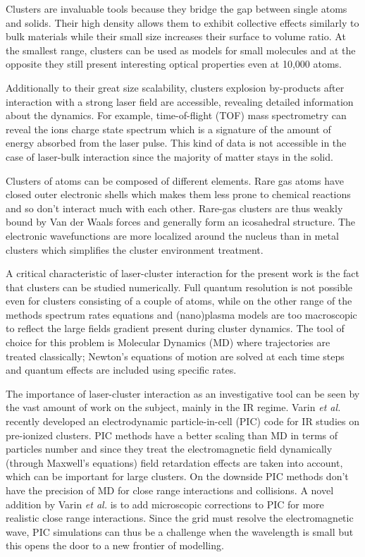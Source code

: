 Clusters are invaluable tools because they bridge the gap between single atoms
and solids. Their high density allows them to exhibit collective effects similarly
to bulk materials while their small
size increases their surface to volume ratio.
At the smallest range, clusters can be used as models for small molecules and
at the opposite they still present interesting optical properties even at 10,000
atoms\cite{Reinhard2004}.

Additionally to their great size scalability, clusters explosion by-products
after interaction with a strong laser field are accessible, revealing detailed
information about the dynamics. For example, time-of-flight (TOF) mass
spectrometry can reveal the ions charge state spectrum which
is a signature of the amount
of energy absorbed from the laser pulse. This kind of data is not accessible
in the case of laser-bulk interaction since the majority of matter stays
in the solid.

Clusters of atoms can be composed of different elements. Rare gas atoms have
closed outer electronic shells which makes them less prone to chemical
reactions and so don't interact much with each other. Rare-gas clusters are
thus weakly bound by Van der Waals forces and generally form
an icosahedral structure\cite{Martin1996}. The electronic wavefunctions are
more localized around the nucleus than in metal clusters which simplifies the
cluster environment treatment.

A critical characteristic of laser-cluster interaction for the present
work is the fact that clusters can be studied numerically. Full quantum resolution
is not possible even for clusters consisting of a couple of atoms, while on the
other range of the methods spectrum rates equations and (nano)plasma models are
too macroscopic to reflect the large fields gradient present during cluster
dynamics\cite{Fennel2010}. The tool of choice for this problem is Molecular Dynamics
(MD) where trajectories are treated classically; Newton's equations of motion are
solved at each time steps and quantum effects are included using specific rates.

The importance of laser-cluster interaction as an investigative tool
can be seen by the vast amount of work on the subject, mainly
in the IR regime\cite{Fennel2010}. Varin \textit{et al.}\cite{Varin2012}
recently developed an electrodynamic
particle-in-cell (PIC) code for IR studies on pre-ionized clusters. PIC methods
have a better scaling than MD in terms of particles number and since they treat
the electromagnetic field dynamically (through Maxwell's equations) field
retardation effects are taken into account, which can be important for large
clusters. On the downside PIC methods don't have the precision of MD for close
range interactions and collisions. A novel addition by Varin \textit{et al.}
is to add microscopic corrections to PIC for more realistic close range
interactions\cite{Peltz2012}.
Since the grid must resolve the electromagnetic wave,
PIC simulations can thus be a challenge when the wavelength is small
but this opens the door to a new frontier of modelling.

